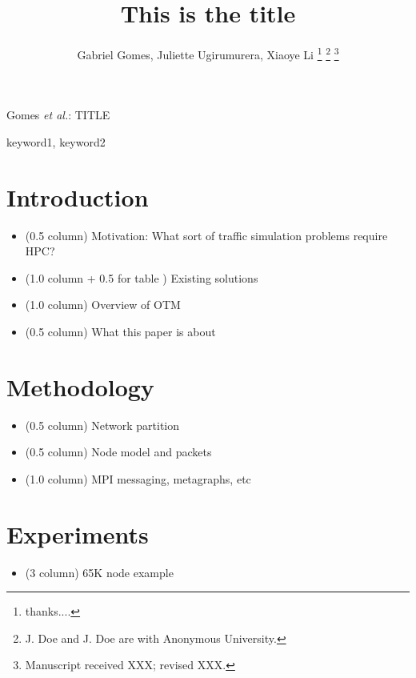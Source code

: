 \documentclass[journal]{IEEEtran}
\begin{document}
\title{This is the title}

\author{Gabriel Gomes,
        Juliette Ugirumurera,
        Xiaoye Li%
\thanks{thanks....}%
\thanks{J. Doe and J. Doe are with Anonymous University.}%
\thanks{Manuscript received XXX; revised XXX.}}

%
{Gomes \MakeLowercase{\textit{et al.}}: TITLE}

\maketitle

\begin{abstract}

\end{abstract}

\begin{IEEEkeywords}
keyword1, keyword2
\end{IEEEkeywords}

\IEEEpeerreviewmaketitle

\section{Introduction}
\begin{itemize}
\item (0.5 column) Motivation: What sort of traffic simulation problems require HPC?
\item (1.0 column + 0.5 for table ) Existing solutions
\item (1.0 column) Overview of OTM
\item (0.5 column) What this paper is about
\end{itemize}
% 

\section{Methodology}
\begin{itemize}
\item (0.5 column) Network partition
\item (0.5 column)  Node model and packets
\item (1.0 column) MPI messaging, metagraphs, etc
\end{itemize}
% 

\section{Experiments}

\begin{itemize}
\item (3 column) 65K node example 
\end{itemize}
\end{document}
